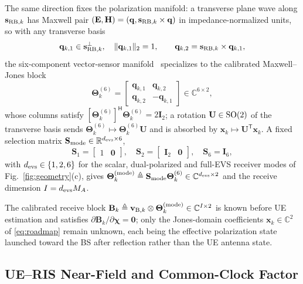 \documentclass[letterpaper,journal]{IEEEtran}
\newcommand{\R}{\mathbb{R}}
\newcommand{\C}{\mathbb{C}}
\newcommand{\bx}{\mathbf{x}}
\newcommand{\bv}{\mathbf{v}}
\newcommand{\bs}{\mathbf{s}}
\newcommand{\bq}{\mathbf{q}}
\newcommand{\bBm}{\mathbf{B}}
\newcommand{\bE}{\mathbf{E}}
\newcommand{\bH}{\mathbf{H}}
\newcommand{\bI}{\mathbf{I}}
\newcommand{\bS}{\mathbf{S}}
\newcommand{\bU}{\mathbf{U}}
\newcommand{\bTheta}{\boldsymbol{\Theta}}
\newcommand{\bchi}{\boldsymbol{\chi}}
\begin{document}
The same direction fixes the polarization manifold: a transverse plane wave
along $\bs_{{\rm RB},k}$ has Maxwell pair
$(\bE,\bH)=(\bq,\bs_{{\rm RB},k}\times\bq)$ in impedance-normalized units, so
with any transverse basis
\begin{equation}
	\bq_{k,1}\in\bs_{{\rm RB},k}^{\perp},
	\quad \|\bq_{k,1}\|_2=1,
	\qquad
	\bq_{k,2}=\bs_{{\rm RB},k}\times\bq_{k,1},
	\label{eq:qbasis}
\end{equation}
the six-component
vector-sensor manifold~\cite{nehorai1994vector,khan2020sixcomponent}
specializes to the calibrated Maxwell--Jones block
\begin{equation}
	\bTheta_k^{(6)}=\begin{bmatrix}
	\bq_{k,1} & \bq_{k,2}\\[1pt]
	\bq_{k,2} & -\bq_{k,1}\end{bmatrix}\in\C^{6\times2},
	\label{eq:Theta}
\end{equation}
whose columns satisfy
$[\bTheta_k^{(6)}]^{\mathsf H}\bTheta_k^{(6)}=2\bI_2$; a rotation
$\bU\in{\rm SO}(2)$ of the transverse basis sends
$\bTheta_k^{(6)}\mapsto\bTheta_k^{(6)}\bU$ and is absorbed by
$\bx_k\mapsto\bU^{\mathsf T}\bx_k$. A fixed selection matrix
$\bS_{\rm mode}\in\R^{d_{\rm evs}\times6}$,
\begin{equation}
	\bS_1=\begin{bmatrix}1 & \mathbf 0\end{bmatrix},
	\quad
	\bS_2=\begin{bmatrix}\bI_2 & \mathbf 0\end{bmatrix},
	\quad
	\bS_6=\bI_6,
	\label{eq:smode}
\end{equation}
with $d_{\rm evs}\in\{1,2,6\}$ for the scalar, dual-polarized and full-EVS
receiver modes of Fig.~\ref{fig:geometry}(c), gives
$\bTheta_k^{({\rm mode})}\triangleq\bS_{\rm mode}\bTheta_k^{(6)}
\in\C^{d_{\rm evs}\times2}$ and the receive dimension $I=d_{\rm evs}M_A$.

The calibrated receive block
$\bBm_k\triangleq\bv_{{\rm B},k}\otimes\bTheta_k^{({\rm mode})}\in\C^{I\times2}$
is known before UE estimation and satisfies
$\partial\bBm_k/\partial\bchi=\mathbf0$; only the Jones-domain coefficients
$\bx_k\in\C^2$ of \eqref{eq:roadmap} remain unknown, each being the effective
polarization state launched toward the BS after reflection rather than the UE
antenna state.

\subsection{UE--RIS Near-Field and Common-Clock Factor}
\label{subsec:defchain}
\end{document}
